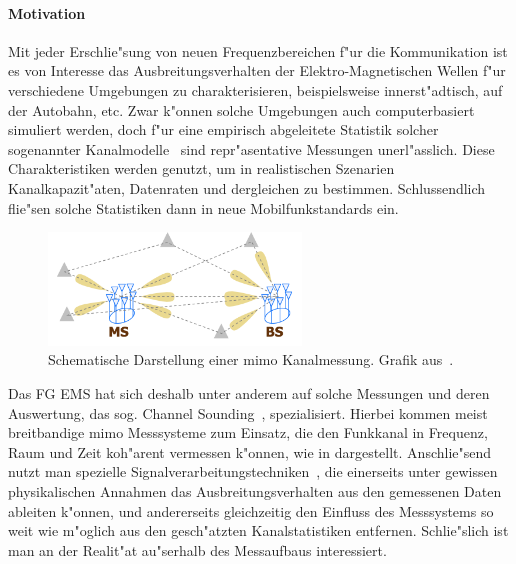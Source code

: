 %
\paragraph{Motivation}
%
%
Mit jeder Erschlie"sung von neuen Frequenzbereichen f"ur die Kommunikation ist es von Interesse das Ausbreitungsverhalten der Elektro-Magnetischen Wellen f"ur verschiedene Umgebungen zu charakterisieren, beispielsweise innerst"adtisch, auf der Autobahn, etc.
Zwar k"onnen solche Umgebungen auch computerbasiert simuliert werden, doch f"ur eine empirisch abgeleitete Statistik solcher sogenannter Kanalmodelle~\cite{delgaldo2007phd} sind repr"asentative Messungen unerl"asslich. 
Diese Charakteristiken werden genutzt, um in realistischen Szenarien Kanalkapazit"aten, Datenraten und dergleichen zu bestimmen. 
Schlussendlich flie"sen solche Statistiken dann in neue Mobilfunkstandards ein.

\begin{figure}
    \centering\includegraphics[width=0.6\textwidth]{img/eadf/sounding.png}
    \caption{Schematische Darstellung einer \acrshort{mimo} Kanalmessung. Grafik aus~\cite{richter_estimation_2005}.}\label{fig:eadf:sounding}
\end{figure}

Das FG EMS hat sich deshalb unter anderem auf solche Messungen und deren Auswertung, das sog. Channel Sounding~\cite{thomae2005multidim_hrpe}, spezialisiert. Hierbei kommen meist breitbandige \gls{mimo} Messsysteme zum Einsatz, die den Funkkanal in Frequenz, Raum und Zeit koh"arent vermessen k"onnen, wie in  dargestellt. Anschlie"send nutzt man spezielle Signalverarbeitungstechniken~\cite{semper2023wideband_channel_sounding}, die einerseits unter gewissen physikalischen Annahmen das Ausbreitungsverhalten aus den gemessenen Daten ableiten k"onnen, und andererseits gleichzeitig den Einfluss des Messsystems so weit wie m"oglich aus den gesch"atzten Kanalstatistiken entfernen. Schlie"slich ist man an der Realit"at au"serhalb des Messaufbaus interessiert. 

